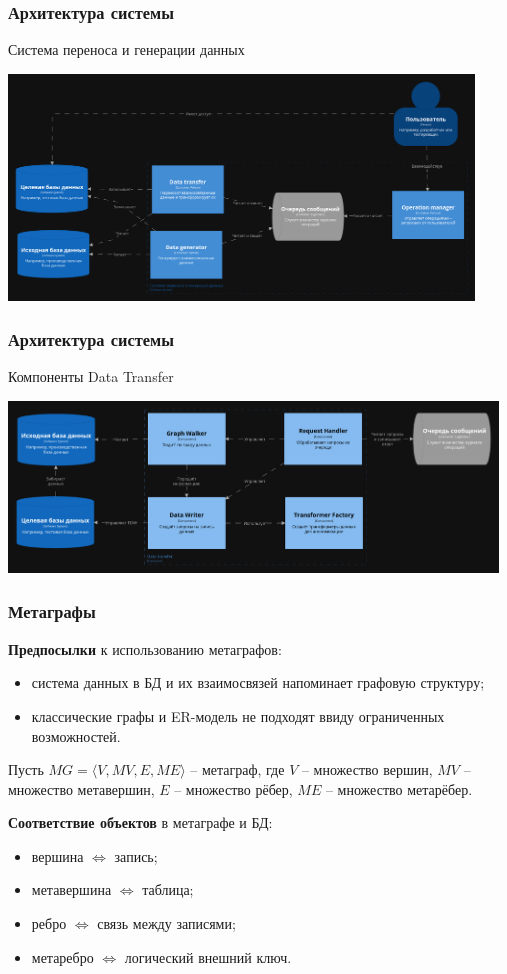 \documentclass[pdf, hyperref={unicode}, aspectratio=169]{beamer}
\begin{document}
\begin{frame}
\frametitle{Архитектура системы}
	Система переноса и генерации данных

	\begin{center}
		\includegraphics[height = 6cm]{img/structurizr-Containers-cut}
	\end{center}
\end{frame}


\begin{frame}
\frametitle{Архитектура системы}
	Компоненты Data Transfer

	\begin{center}
		\includegraphics[width = 13cm]{img/structurizr-DataTransferComponents-cut}
	\end{center}
\end{frame}


\begin{frame}
\frametitle{Метаграфы}
	\textbf{Предпосылки} к использованию метаграфов:

	\begin{itemize}
		\item система данных в БД и их взаимосвязей напоминает графовую структуру;
		\item классические графы и ER-модель не подходят ввиду ограниченных возможностей.
	\end{itemize}

	Пусть $MG = \langle V, MV, E, ME \rangle$ -- метаграф, где $V$ -- множество вершин, $MV$ -- множество метавершин, $E$ -- множество рёбер, $ME$ -- множество метарёбер.

	\textbf{Соответствие объектов} в метаграфе и БД:
	\begin{itemize}
		\item вершина $\Leftrightarrow$ запись;
		\item метавершина $\Leftrightarrow$ таблица;
		\item ребро $\Leftrightarrow$ связь между записями;
		\item метаребро $\Leftrightarrow$ логический внешний ключ.
	\end{itemize}
\end{frame}
\end{document}

